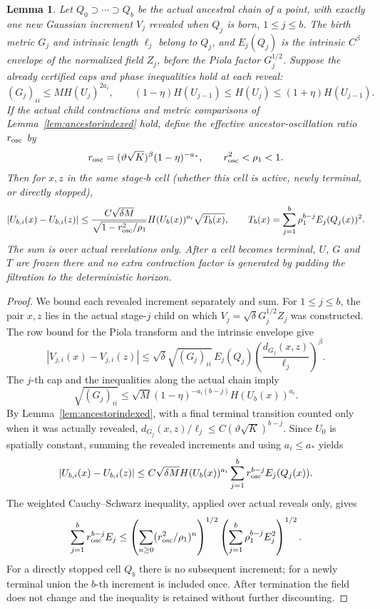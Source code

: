 \documentclass[11pt]{article}
\newtheorem{lemma}[lemma]{Lemma}
\theoremstyle{definition}
\theoremstyle{remark}
\numberwithin{equation}{section}
\begin{document}
\begin{lemma}\label{lem:actualphase}
Let $Q_0\supset\cdots\supset Q_b$ be the actual ancestral chain of a
point, with exactly one new Gaussian increment $V_j$ revealed when
$Q_j$ is born, $1\le j\le b$.  The birth metric $G_j$ and intrinsic
length $\ell_j$ belong to $Q_j$, and $E_j(Q_j)$ is the intrinsic $C^\beta$ envelope of the
normalized field $Z_j$, before the Piola factor $G_j^{1/2}$. Suppose the already certified caps and
phase inequalities hold at each reveal:
\[
 (G_j)_{ii}\le M H(U_j)^{2a_i},\qquad
 (1-\eta)H(U_{j-1})\le H(U_j)\le(1+\eta)H(U_{j-1}).
\]
If the actual child contractions and metric comparisons of
Lemma~\ref{lem:ancestorindexed} hold, define the effective
ancestor-oscillation ratio $r_{\rm osc}$ by
\[
 r_{\rm osc}=(\vartheta\sqrt K)^\beta(1-\eta)^{-a_*},
 \qquad r_{\rm osc}^2<\rho_1<1.
\]
Then for $x,z$ in the same stage-$b$ cell (whether this cell is
active, newly terminal, or directly stopped),
\begin{equation}\label{eq:actualphasetransfer}
 |U_{b,i}(x)-U_{b,i}(z)|
 \le \frac{C\sqrt{\delta M}}{\sqrt{1-r_{\rm osc}^2/\rho_1}}
 H(U_b(x))^{a_i}\sqrt{T_b(x)},
 \qquad T_b(x)=\sum_{j=1}^{b}\rho_1^{b-j}E_j(Q_j(x))^2.
\end{equation}
The sum is over actual revelations only.  After a cell becomes terminal,
$U$, $G$ and $T$ are frozen there and no extra contraction factor is
generated by padding the filtration to the deterministic horizon.
\end{lemma}
\begin{proof}
We bound each revealed increment separately and sum.
For $1\le j\le b$, the pair $x,z$ lies in the actual stage-$j$
child on which $V_j=\sqrt\delta G_j^{1/2}Z_j$ was constructed.
The row bound for the Piola transform and the intrinsic envelope give
\[
 |V_{j,i}(x)-V_{j,i}(z)|
 \le\sqrt\delta\sqrt{(G_j)_{ii}}\,E_j(Q_j)
 \left(\frac{d_{G_j}(x,z)}{\ell_j}\right)^\beta.
\]
The $j$-th cap and the inequalities along the actual chain imply
\[
 \sqrt{(G_j)_{ii}}
 \le \sqrt M(1-\eta)^{-a_i(b-j)}H(U_b(x))^{a_i}.
\]
By Lemma~\ref{lem:ancestorindexed}, with a final terminal transition
counted only when it was actually revealed,
$d_{G_j}(x,z)/\ell_j\le C(\vartheta\sqrt K)^{b-j}$.
Since $U_0$ is spatially constant, summing the revealed increments
and using $a_i\le a_*$ yields
\[
 |U_{b,i}(x)-U_{b,i}(z)|\le
 C\sqrt{\delta M}H(U_b(x))^{a_i}
 \sum_{j=1}^{b}r_{\rm osc}^{b-j}E_j(Q_j(x)).
\]
The weighted Cauchy--Schwarz inequality, applied over actual
reveals only, gives
\[
 \sum_{j=1}^{b}r_{\rm osc}^{b-j}E_j
 \le\left(\sum_{n\ge0}(r_{\rm osc}^2/\rho_1)^n\right)^{1/2}
 \left(\sum_{j=1}^{b}\rho_1^{b-j}E_j^2\right)^{1/2}.
\]
For a directly stopped cell $Q_b$ there is no subsequent increment;
for a newly terminal union the $b$-th increment is included once.
After termination the field does not change and the inequality
is retained without further discounting.
\end{proof}
\end{document}
